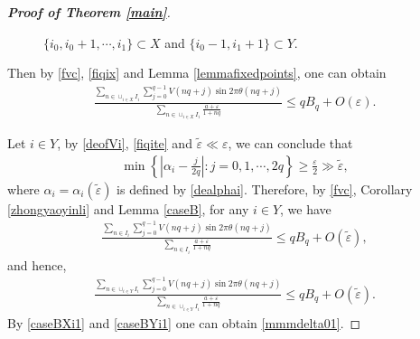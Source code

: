 \documentclass[12pt]{amsart}
\newcommand{\abs}[1]{\left\lvert #1 \right\rvert}
\theoremstyle{plain}
\theoremstyle{definition}
\begin{document}
\begin{proof}[\textbf{Proof of Theorem \ref{main}}]
\begin{figure}[H]
\caption{$\{i_0,i_0+1,\cdots,i_1\}\subset X$ and $\{i_0-1,i_1+1\}\subset Y$.}
\label{figfin}
\end{figure}
Then by  \eqref{fvc}, \eqref{fiqix} and Lemma \ref{lemmafixedpoints}, one can obtain
\begin{align}
	\frac{\sum_{n\in \cup_{i\in X} I_i}\sum_{j=0}^{q-1}V(nq+j)\sin2\pi\theta(nq+j)}{\sum_{n\in \cup_{i\in X} I_i}\frac{a+\varepsilon}{1+nq}}\leq qB_q+O(\varepsilon).\label{caseBXi1}
\end{align}

Let $i\in Y$, 
by \eqref{deofVi}, \eqref{fiqite} and $\tilde{\varepsilon}\ll \varepsilon$,
we can conclude that
\begin{align}
	\min\left\{\abs{\alpha_i-\frac{j}{2q}}:j=0,1,\cdots,2q\right\}\geq \frac{\varepsilon}{2}\gg\tilde{\varepsilon},\nonumber
\end{align}
where $\alpha_i=\alpha_i(\tilde{\varepsilon})$ is defined by \eqref{dealphai}. 
Therefore, by \eqref{fvc}, Corollary \ref{zhongyaoyinli} and Lemma \ref{caseB}, for any $i\in Y$, we have
\begin{align}
	\frac{\sum_{n\in I_i}\sum_{j=0}^{q-1}V(nq+j)\sin2\pi\theta(nq+j)}{\sum_{n\in I_i}\frac{a+\varepsilon}{1+nq}}\leq qB_q+O(\tilde{\varepsilon}),\nonumber
\end{align}
and hence,
\begin{align}
	\frac{\sum_{n\in \cup_{i\in Y} I_i}\sum_{j=0}^{q-1}V(nq+j)\sin2\pi\theta(nq+j)}{\sum_{n\in \cup_{i\in Y} I_i}\frac{a+\varepsilon}{1+nq}}\leq qB_q+O(\tilde{\varepsilon}).\label{caseBYi1}
\end{align}
By \eqref{caseBXi1} and \eqref{caseBYi1} one can obtain \eqref{mmmdelta01}.


\end{proof}
\end{document}

